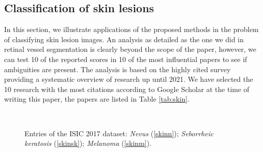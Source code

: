 \documentclass[5p, final]{elsarticle}
\begin{document}
\subsection{Classification of skin lesions}
\label{sec:third}
In this section, we illustrate applications of the proposed methods in the problem of classifying skin lesion images. An analysis as detailed as the one we did in retinal vessel segmentation \cite{vessel} is clearly beyond the scope of the paper, however, we can test 10 of the reported scores in 10 of the most influential papers to see if ambiguities are present. The analysis is based on the highly cited survey \cite{skinsurvey} providing a systematic overview of research up until 2021. We have selected the 10 research with the most citations according to Google Scholar at the time of writing this paper, the papers are listed in Table \ref{tab:skin}.

\begin{figure}[t]
\begin{center}
\\
\end{center}
\caption{Entries of the ISIC 2017 \cite{isic2017} dataset: \emph{Nevus} (\ref{skinn}); \emph{Seborrheic keratosis} (\ref{skinsk}); \emph{Melanoma} (\ref{skinm}).}
\label{figskin}
\end{figure}
\end{document}
